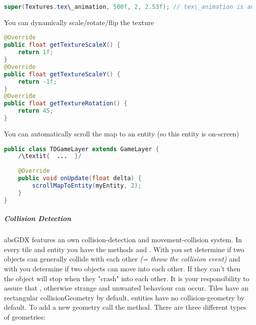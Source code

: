\doinline
\begin{lstlisting}[caption=Markdown Tutorial: fenced code block, title=\hspace{0 pt}, language=java]
super(Textures.tex\_animation, 500f, 2, 2.53f); // tex\_animation is an array
\end{lstlisting}

You can dynamically scale/rotate/flip the texture

\doinline
\begin{lstlisting}[caption=Markdown Tutorial: fenced code block, title=\hspace{0 pt}, language=java]
@Override
public float getTextureScaleX() { 
	return 1f;
}
@Override
public float getTextureScaleY() {
	return -1f;
}
@Override
public float getTextureRotation() {
	return 45;
}
\end{lstlisting}

You can automatically scroll the map to an entity (so this entity is on-screen)

\doinline
\begin{lstlisting}[caption=Markdown Tutorial: fenced code block, title=\hspace{0 pt}, language=java]
public class TDGameLayer extends GameLayer {
	/\textit{  ...  }/
	
	@Override
	public void onUpdate(float delta) {
		scrollMapToEntity(myEntity, 2);
	}
}
\end{lstlisting}

\subparagraph{Collision Detection}

absGDX features an own collision-detection and movement-collision system.
In every tile and entity you have the methods  and . With  you set determine if two objects can generally collide with each other \textit{(= throw the collision event)} and with  you determine if two objects can move into each other. If they can't then the object will stop when they "crash" into each other. It is your responsibility to assure that , otherwise strange and unwanted behaviour can occur.
Tiles have an rectangular collisionGeometry by default, entities have no collision-geometry by default. To add a new geometry call the  method. There are three different types of geometries:

